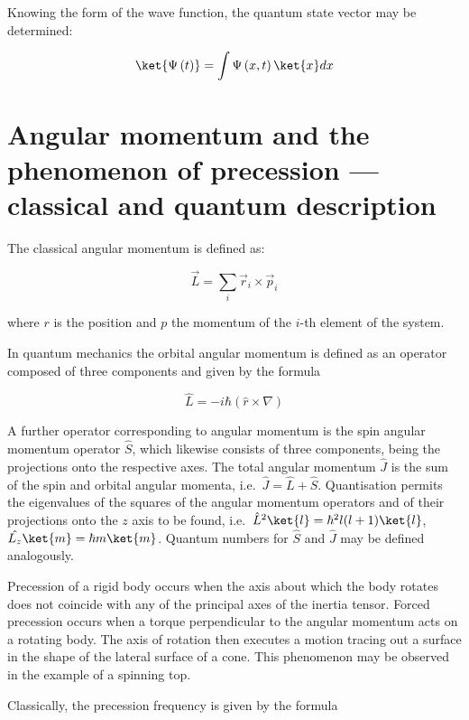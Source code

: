 Knowing the form of the wave function, the quantum state vector may be determined:

\begin{equation}
    \ket{\Psi\left(t\right)} = \int \Psi\left(x,t\right)\ket{x}dx
\end{equation}

\section{Angular momentum and the phenomenon of precession --- classical and quantum description}

The classical angular momentum is defined as:

\begin{equation}
    \vec{L} = \sum_i \vec{r}_i \times \vec{p}_i
\end{equation}

where $r$ is the position and $p$ the momentum of the $i$-th element of the system.

In quantum mechanics the orbital angular momentum is defined as an operator composed of three components and given by the formula

\begin{equation}
    \hat{L} = -i\hbar(\hat{r}\times \nabla)
\end{equation}

A further operator corresponding to angular momentum is the spin angular momentum operator $\hat{S}$, which likewise consists of three components, being the projections onto the respective axes. The total angular momentum $\hat{J}$ is the sum of the spin and orbital angular momenta, i.e.\ $\hat{J} = \hat{L} + \hat{S}$. Quantisation permits the eigenvalues of the squares of the angular momentum operators and of their projections onto the $z$ axis to be found, i.e.\ $\hat{L}^2\ket{l} = \hbar^2 l(l+1)\ket{l}$, $\hat{L_z}\ket{m} = \hbar m\ket{m}$. Quantum numbers for $\hat{S}$ and $\hat{J}$ may be defined analogously.

Precession of a rigid body occurs when the axis about which the body rotates does not coincide with any of the principal axes of the inertia tensor. Forced precession occurs when a torque perpendicular to the angular momentum acts on a rotating body. The axis of rotation then executes a motion tracing out a surface in the shape of the lateral surface of a cone. This phenomenon may be observed in the example of a spinning top.

Classically, the precession frequency is given by the formula

